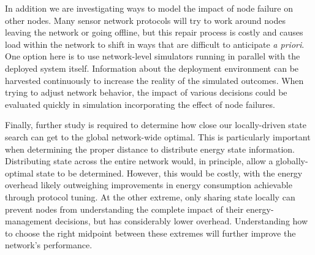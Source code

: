 In addition we are investigating ways to model the impact of node failure on
other nodes. Many sensor network protocols will try to work around nodes
leaving the network or going offline, but this repair process is costly and
causes load within the network to shift in ways that are difficult to
anticipate \textit{a priori}. One option here is to use network-level
simulators running in parallel with the deployed system itself. Information
about the deployment environment can be harvested continuously to increase
the reality of the simulated outcomes. When trying to adjust network
behavior, the impact of various decisions could be evaluated quickly in
simulation incorporating the effect of node failures.

Finally, further study is required to determine how close our locally-driven
state search can get to the global network-wide optimal. This is particularly
important when determining the proper distance to distribute energy state
information. Distributing state across the entire network would, in
principle, allow a globally-optimal state to be determined. However, this
would be costly, with the energy overhead likely outweighing improvements in
energy consumption achievable through protocol tuning. At the other extreme,
only sharing state locally can prevent nodes from understanding the complete
impact of their energy-management decisions, but has considerably lower
overhead. Understanding how to choose the right midpoint between these
extremes will further improve the network's performance.
